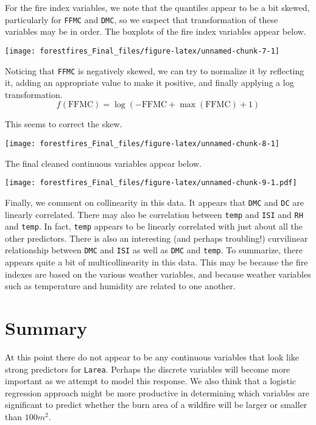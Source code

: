 \documentclass[]{article}
\begin{document}
For the fire index variables, we note that the quantiles appear to be a
bit skewed, particularly for \texttt{FFMC} and \texttt{DMC}, so we
suspect that transformation of these variables may be in order. The
boxplots of the fire index variables appear below.

\begin{center}\texttt{[image: forestfires\_Final\_files/figure-latex/unnamed-chunk-7-1]} \end{center}

Noticing that \texttt{FFMC} is negatively skewed, we can try to
normalize it by reflecting it, adding an appropriate value to make it
positive, and finally applying a log transformation.
\[f(\text{FFMC}) = \log(-\text{FFMC}+ \max(\text{FFMC})+1) \]

This seems to correct the skew.

\begin{center}\texttt{[image: forestfires\_Final\_files/figure-latex/unnamed-chunk-8-1]} \end{center}

The final cleaned continuous variables appear below.

\texttt{[image: forestfires\_Final\_files/figure-latex/unnamed-chunk-9-1.pdf]}

Finally, we comment on collinearity in this data. It appears that
\texttt{DMC} and \texttt{DC} are linearly correlated. There may also be
correlation between \texttt{temp} and \texttt{ISI} and \texttt{RH} and
\texttt{temp}. In fact, \texttt{temp} appears to be linearly correlated
with just about all the other predictors. There is also an interesting
(and perhaps troubling!) curvilinear relationship between \texttt{DMC}
and \texttt{ISI} as well as \texttt{DMC} and \texttt{temp}. To
summarize, there appears quite a bit of multicollinearity in this data.
This may be because the fire indexes are based on the various weather
variables, and because weather variables such as temperature and
humidity are related to one another.

\section{Summary}\label{summary}

At this point there do not appear to be any continuous variables that
look like strong predictors for \texttt{Larea}. Perhaps the discrete
variables will become more important as we attempt to model this
response. We also think that a logistic regression approach might be
more productive in determining which variables are significant to
predict whether the burn area of a wildfire will be larger or smaller
than \(100m^2.\)
\end{document}
